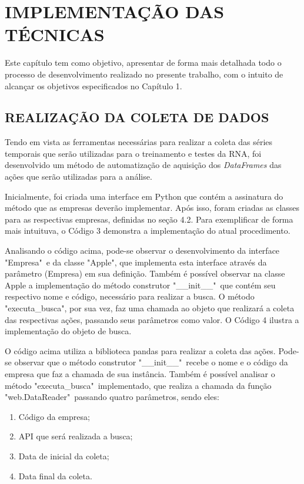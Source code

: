 
\chapter{IMPLEMENTAÇÃO DAS TÉCNICAS}\label{ch:implementacao}
Este capítulo tem como objetivo, apresentar de forma mais detalhada todo o processo de desenvolvimento realizado no presente trabalho, com o intuito de alcançar os objetivos especificados no Capítulo 1.

\section{REALIZAÇÃO DA COLETA DE DADOS}
Tendo em vista as ferramentas necessárias para realizar a coleta das séries temporais que serão utilizadas para o treinamento e testes da RNA, foi desenvolvido um método de automatização de aquisição dos \textit{DataFrames} das ações que serão utilizadas para a análise.

Inicialmente, foi criada uma interface em Python que contém a assinatura do método que as empresas deverão implementar. Após isso, foram criadas as classes para as respectivas empresas, definidas no seção 4.2. Para exemplificar de forma mais intuituva, o Código 3 demonstra a implementação do atual procedimento. 
\codigoPython\


Analisando o código acima, pode-se observar o desenvolvimento da interface "Empresa"\, e da classe "Apple", que implementa esta interface através da parâmetro (Empresa) em sua definição. Também é possível observar na classe Apple a implementação do método construtor "\_\_init\_\_"\, que contém seu respectivo nome e código, necessário para realizar a busca. O método "executa\_busca", por sua vez, faz uma chamada ao objeto que realizará a coleta das respectivas ações, passando seus parâmetros como valor. O Código 4 ilustra a implementação do objeto de busca.



O código acima utiliza a biblioteca pandas para realizar a coleta das ações. Pode-se observar que o método construtor "\_\_init\_\_"\, recebe o nome e o código da empresa que faz a chamada de sua instância. Também é possível analisar o método "executa\_busca"\, implementado, que realiza a chamada da função "web.DataReader"\,
passando quatro parâmetros, sendo eles:
\begin{enumerate}
\item Código da empresa;
\item API que será realizada a busca;
\item Data de inicial da coleta;
\item Data final da coleta.
\end{enumerate}

